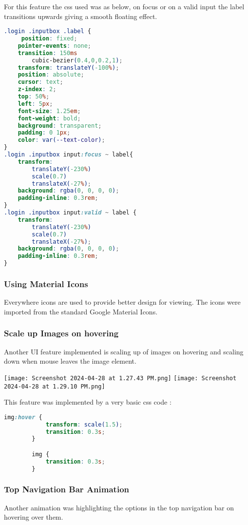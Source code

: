 \documentclass{article}
\begin{document}
For this feature the css used was as below, on focus or on a valid input the label transitions upwards giving a smooth floating effect.
\begin{lstlisting}[language=css]
     .login .inputbox .label {
     position: fixed;
    pointer-events: none; 
    transition: 150ms
        cubic-bezier(0.4,0,0.2,1); 
    transform: translateY(-100%);
    position: absolute;
    cursor: text;
    z-index: 2;
    top: 50%;
    left: 5px;
    font-size: 1.25em;
    font-weight: bold;
    background: transparent;
    padding: 0 1px;
    color: var(--text-color);
} 
.login .inputbox input:focus ~ label{
    transform: 
        translateY(-230%)
        scale(0.7)
        translateX(-27%);
    background: rgba(0, 0, 0, 0);
    padding-inline: 0.3rem;
}
.login .inputbox input:valid ~ label {
    transform: 
        translateY(-230%)
        scale(0.7)
        translateX(-27%);
    background: rgba(0, 0, 0, 0);
    padding-inline: 0.3rem;
}
\end{lstlisting}
\subsubsection{Using Material Icons}
Everywhere icons are used to provide better design for viewing. The icons were imported from the standard Google Material Icons.

\subsubsection{Scale up Images on hovering}
Another UI feature implemented is scaling up of images on hovering and scaling down when mouse leaves the image element.

\texttt{[image: Screenshot 2024-04-28 at 1.27.43 PM.png]}
\texttt{[image: Screenshot 2024-04-28 at 1.29.10 PM.png]}

This feature was implemented by a very basic css code : 
\begin{lstlisting}[language=css]
    img:hover {
            transform: scale(1.5);
            transition: 0.3s;
        }

        img {
            transition: 0.3s;
        }
\end{lstlisting}
\subsubsection{Top Navigation Bar Animation}
Another animation was highlighting the options in the top navigation bar on hovering over them.
\end{document}
